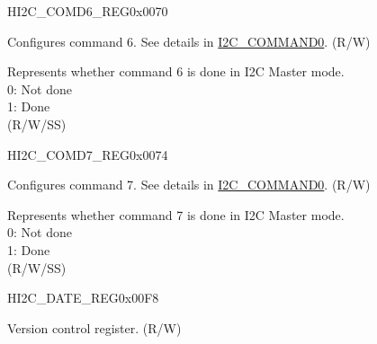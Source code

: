     \begin{register}{H}{I2C\_COMD6\_REG}{0x0070}\label{regdesc:I2CCOMD6REG}
    \regnewline%
    \begin{regdesc}\begin{reglist}
    \label{fielddesc:I2CCOMMAND6}\item [I2C\_COMMAND6] Configures command 6. See details in \hyperref[fielddesc:I2CCOMMAND0]{I2C\_COMMAND0}. (R/W)
    \label{fielddesc:I2CCOMMAND6DONE}\item [I2C\_COMMAND6\_DONE] Represents whether command 6 is done in I2C Master mode.\\
    0: Not done \\
    1: Done \\ (R/W/SS)
    \end{reglist}\end{regdesc}
    \end{register}


    \begin{register}{H}{I2C\_COMD7\_REG}{0x0074}\label{regdesc:I2CCOMD7REG}
    \regnewline%
    \begin{regdesc}\begin{reglist}
    \label{fielddesc:I2CCOMMAND7}\item [I2C\_COMMAND7] Configures command 7. See details in \hyperref[fielddesc:I2CCOMMAND0]{I2C\_COMMAND0}. (R/W)
    \label{fielddesc:I2CCOMMAND7DONE}\item [I2C\_COMMAND7\_DONE] Represents whether command 7 is done in I2C Master mode.\\
    0: Not done \\
    1: Done \\ (R/W/SS)
    \end{reglist}\end{regdesc}
    \end{register}


    \begin{register}{H}{I2C\_DATE\_REG}{0x00F8}\label{regdesc:I2CDATEREG}
    \regnewline%
    \begin{regdesc}\begin{reglist}
    \label{fielddesc:I2CDATE}\item [I2C\_DATE] Version control register. (R/W)
    \end{reglist}\end{regdesc}
    \end{register}


